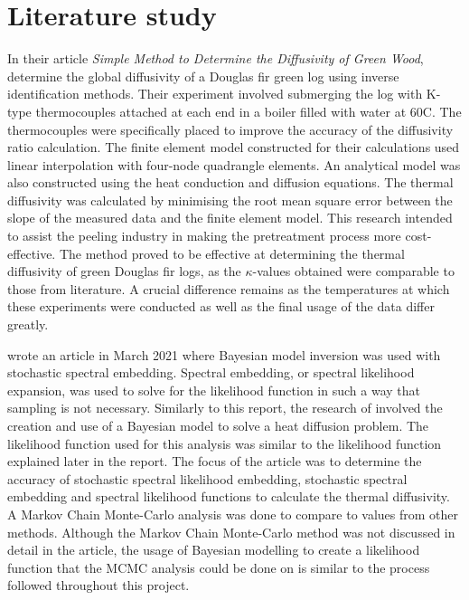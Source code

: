 \section{Literature study}\label{litstudy}
	
	In their article \textit{Simple Method to Determine the Diffusivity of Green Wood}, \citet{bioresource:2020}  determine the global diffusivity of a Douglas fir green log using inverse identification methods. 
	Their experiment involved submerging the log with K-type thermocouples attached at each end in a boiler filled with water at 60\textdegree C.
	The thermocouples were specifically placed to improve the accuracy of the diffusivity ratio calculation.
	The finite element model constructed for their calculations used linear interpolation with four-node quadrangle elements.
	An analytical model was also constructed using the heat conduction and diffusion equations.
	The thermal diffusivity was calculated by minimising the root mean square error between the slope of the measured data and the finite element model.
	This research intended to assist the peeling industry in making the pretreatment process more cost-effective.
	The method proved to be effective at determining the thermal diffusivity of green Douglas fir logs, as the $\kappa$-values obtained were comparable to those from literature.
	A crucial difference remains as the temperatures at which these experiments were conducted as well as the final usage of the data differ greatly.


\citeauthor{Wagner:2021} wrote an article in March 2021 where Bayesian model inversion was used with stochastic spectral embedding.
Spectral embedding, or spectral likelihood expansion, was used to solve for the likelihood function in such a way that sampling is not necessary.
Similarly to this report, the research of \citet{Wagner:2021} involved the creation and use of a Bayesian model to solve a heat diffusion problem.
The likelihood function used for this analysis was similar to the likelihood function explained later in the report.
The focus of the article was to determine the accuracy of stochastic spectral likelihood embedding, stochastic spectral embedding and spectral likelihood functions to calculate the thermal diffusivity.
A Markov Chain Monte-Carlo analysis was done to compare to values from other methods.
Although the Markov Chain Monte-Carlo method was not discussed in detail in the article, the usage of Bayesian modelling to create a likelihood function that the MCMC analysis could be done on is similar to the process followed throughout this project.


